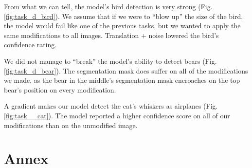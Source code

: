 \documentclass[11pt,a4paper,twocolumn,twoside]{article}
\begin{document}
From what we can tell, the model's bird detection is very strong (Fig.\ref{fig:task_d_bird}). We assume that if we were to “blow up” the size of the bird, the model would fail like one of the previous tasks, but we wanted to apply the same modifications to all images. Translation + noise lowered the bird’s confidence rating.

We did not manage to “break” the model’s ability to detect bears (Fig.\ref{fig:task_d_bear}). The segmentation mask does suffer on all of the modifications we made, as the bear in the middle’s segmentation mask encroaches on the top bear’s position on every modification.


A gradient makes our model detect the cat’s whiskers as airplanes (Fig.\ref{fig:task__cat}). The model reported a higher confidence score on all of our modifications than on the unmodified image. 




\printbibliography








\newpage
\onecolumn
\section{Annex}
\end{document}
